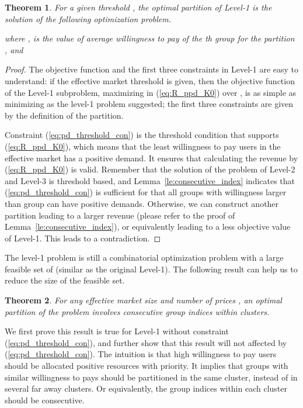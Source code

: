 \documentclass[twocolumn,10pt,twosided]{IEEEtran}
\newtheorem{theorem}{Theorem}
\begin{document}
\begin{theorem}
For a given threshold , the optimal partition of Level-1 is the solution of the following optimization problem.

where
,   is the value of average willingness to pay of the th group for the partition , and 
\end{theorem}


\begin{proof}
The objective function and the first three constraints in Level-1 are easy to understand:
if the effective market threshold  is given, then the objective function of the Level-1 subproblem, maximizing  in (\ref{eq:R_ppd_K0}) over , is as simple as minimizing   as the level-1 problem suggested;
the first three constraints are given by the definition of the partition.

Constraint (\ref{eq:pd_threshold_con}) is the threshold condition that supports  (\ref{eq:R_ppd_K0}), which means that the least willingness to pay users in the effective market has a positive demand.  It ensures that calculating the revenue by (\ref{eq:R_ppd_K0}) is valid. Remember that the solution of the  problem of Level-2 and Level-3 is threshold based, and Lemma~\ref{le:consecutive_index} indicates that (\ref{eq:pd_threshold_con}) is sufficient for that all groups with willingness larger than group  can have positive demands. Otherwise, we can construct another partition leading to a larger revenue (please refer to the proof of Lemma~\ref{le:consecutive_index}), or equivalently leading to a less objective value of Level-1. This leads to a contradiction.
\end{proof}


The level-1 problem is still a combinatorial optimization problem with a large feasible set of  (similar as the original Level-1). The following result can help us to reduce the size of the feasible set.
\begin{theorem}
\label{th:consecutive}
For any effective market size  and number of prices ,  an optimal partition of the  problem involves consecutive group indices within clusters.
\end{theorem}

 We first prove this result is true for Level-1 without constraint (\ref{eq:pd_threshold_con}), and further show that this result will not affected by (\ref{eq:pd_threshold_con}). The intuition is that high willingness to pay users should be allocated positive resources with priority. It implies that groups with similar willingness to pays should be partitioned in the same cluster, instead of in several far away clusters. Or equivalently, the group indices within each cluster should be consecutive.
\end{document}
